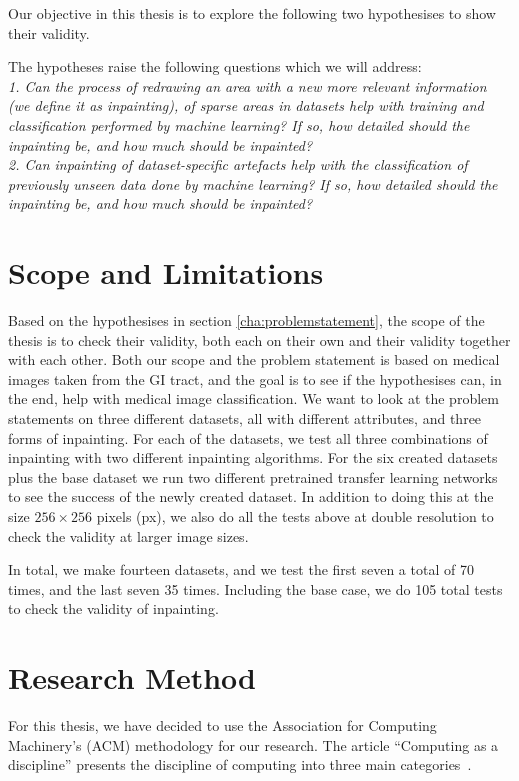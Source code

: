Our objective in this thesis is to explore the following two hypothesises to show their validity.

The hypotheses raise the following questions which we will address:\\

\textit{1. Can the process of redrawing an area with a new more relevant information (we define it as inpainting), of sparse areas in datasets help with training and classification performed by machine learning? If so, how detailed should the inpainting be, and how much should be inpainted?}\\

\textit{2. Can inpainting of dataset-specific artefacts help with the classification of previously unseen data done by machine learning? If so, how detailed should the inpainting be, and how much should be inpainted?}

\section{Scope and Limitations}
Based on the hypothesises in section \ref{cha:problemstatement}, the scope of the thesis is to check their validity, both each on their own and their validity together with each other. 
Both our scope and the problem statement is based on medical images taken from the GI tract, and the goal is to see if the hypothesises can, in the end, help with medical image classification.
We want to look at the problem statements on three different datasets, all with different attributes, and three forms of inpainting.
For each of the datasets, we test all three combinations of inpainting with two different inpainting algorithms. 
For the six created datasets plus the base dataset we run two different pretrained transfer learning networks to see the success of the newly created dataset.
In addition to doing this at the size $256 \times 256$ pixels (px), we also do all the tests above at double resolution to check the validity at larger image sizes.

In total, we make fourteen datasets, and we test the first seven a total of 70 times, and the last seven 35 times. Including the base case, we do 105 total tests to check the validity of inpainting.



\section{Research Method}
For this thesis, we have decided to use the Association for Computing Machinery's (ACM) methodology for our research. The article ``Computing as a discipline'' presents the discipline of computing into three main categories~\cite{Denning:1989:CD:63238.63239}. 
